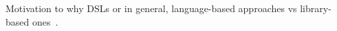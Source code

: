 Motivation to why DSLs or in general, language-based approaches vs library-based ones~\cite{tasharofi2013scala}.

